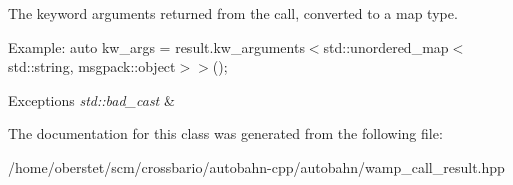 The keyword arguments returned from the call, converted to a map type. 

Example\+: {\ttfamily auto kw\+\_\+args = result.\+kw\+\_\+arguments$<$std\+::unordered\+\_\+map$<$std\+::string, msgpack\+::object$>$$>$();}


\begin{DoxyExceptions}{Exceptions}
{\em std\+::bad\+\_\+cast} & \\
\hline
\end{DoxyExceptions}


The documentation for this class was generated from the following file\+:\begin{DoxyCompactItemize}
\item 
/home/oberstet/scm/crossbario/autobahn-\/cpp/autobahn/wamp\+\_\+call\+\_\+result.\+hpp\end{DoxyCompactItemize}
